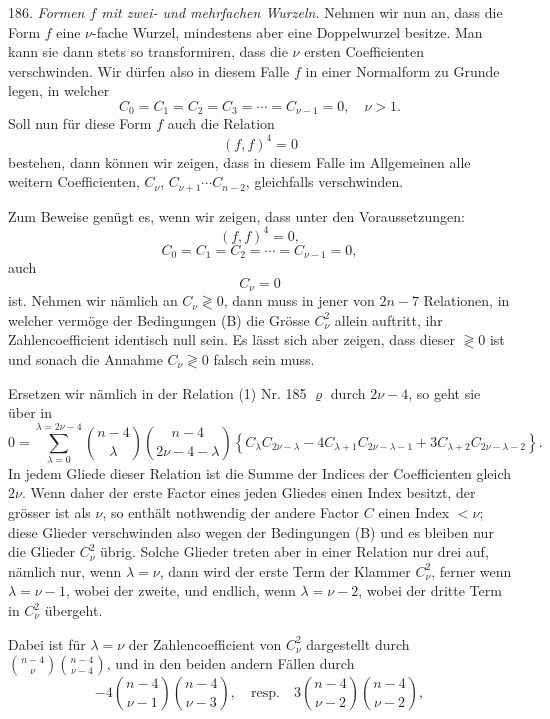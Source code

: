 \documentclass[11pt]{article}
\providecommand{\weberpage}[1]{}
\providecommand{\weq}[2]{\begin{equation}\tag{#1}#2\end{equation}}
\begin{document}
\weberpage{206}
186. \textit{Formen $f$ mit zwei- und mehrfachen Wurzeln.} Nehmen wir
nun an, dass die Form $f$ eine $\nu$-fache Wurzel, mindestens aber
eine Doppelwurzel besitze. Man kann sie dann stets so transformiren,
dass die $\nu$ ersten Coefficienten verschwinden. Wir d\"urfen also in
diesem Falle $f$ in einer Normalform zu Grunde legen, in welcher
\weq{I}{C_0 = C_1 = C_2 = C_3 = \cdots = C_{\nu-1} = 0,\quad \nu > 1.}
Soll nun f\"ur diese Form $f$ auch die Relation
\[
(f,f)^4 = 0
\]
bestehen, dann k\"onnen wir zeigen, dass in diesem Falle im Allgemeinen
alle weitern Coefficienten, $C_\nu$, $C_{\nu+1}\cdots C_{n-2}$,
gleichfalls verschwinden.

Zum Beweise gen\"ugt es, wenn wir zeigen, dass unter den
Voraussetzungen:
\weq{A}{(f,f)^4 = 0,}
\weq{B}{C_0 = C_1 = C_2 = \cdots = C_{\nu-1} = 0,}
auch
\[
C_\nu = 0
\]
ist. Nehmen wir n\"amlich an $C_\nu \gtrless 0$, dann muss in jener
von $2n-7$ Relationen, in welcher verm\"oge der Bedingungen (B) die
Gr\"osse $C_\nu^2$ allein auftritt, ihr Zahlencoefficient identisch
null sein. Es l\"asst sich aber zeigen, dass dieser $\gtrless 0$ ist
und sonach die Annahme $C_\nu \gtrless 0$ falsch sein muss.

Ersetzen wir n\"amlich in der Relation (1) Nr. 185 $\varrho$ durch
$2\nu-4$, so geht sie \"uber in
\weq{II}{0 = \sum_{\lambda=0}^{\lambda=2\nu-4}\binom{n-4}{\lambda}\binom{n-4}{2\nu-4-\lambda}\left\{C_\lambda C_{2\nu-\lambda} - 4C_{\lambda+1}C_{2\nu-\lambda-1} + 3C_{\lambda+2}C_{2\nu-\lambda-2}\right\}.}
In jedem Gliede dieser Relation ist die Summe der Indices der
Coefficienten gleich $2\nu$. Wenn daher der erste Factor eines jeden
Gliedes einen Index besitzt, der gr\"osser ist als $\nu$, so enth\"alt
nothwendig der andere Factor $C$ einen Index $< \nu$; diese Glieder
verschwinden also wegen der Bedingungen (B) und es bleiben nur die
Glieder $C_\nu^2$ \"ubrig. Solche Glieder treten aber in einer
Relation nur drei auf, n\"amlich nur, wenn $\lambda = \nu$, dann wird
der erste Term der Klammer $C_\nu^2$, ferner wenn $\lambda = \nu-1$,
wobei der zweite, und endlich, wenn $\lambda = \nu-2$, wobei der
dritte Term in $C_\nu^2$ \"ubergeht.

Dabei ist f\"ur $\lambda = \nu$ der Zahlencoefficient von $C_\nu^2$
dargestellt durch $\binom{n-4}{\nu}\binom{n-4}{\nu-4}$, und in den
beiden andern F\"allen durch
\[
-4\binom{n-4}{\nu-1}\binom{n-4}{\nu-3},\quad\text{resp.}\quad 3\binom{n-4}{\nu-2}\binom{n-4}{\nu-2},
\]
\end{document}
